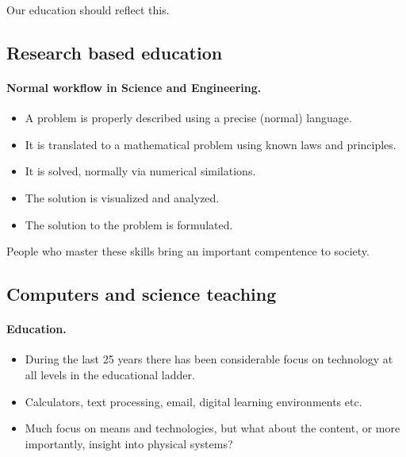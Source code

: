 \documentclass[%
twoside,                 %
final,                   %
10pt]{article}
\begin{document}
\noindent
Our education should reflect this.





\subsection{Research based education}

\paragraph{Normal workflow in Science and Engineering.}

\begin{itemize}
\item A problem is properly described using a precise (normal) language.

\item It is translated to a mathematical problem using known laws and  principles.

\item It is solved, normally via numerical similations.

\item The solution is visualized and analyzed.

\item The solution to the problem is formulated.
\end{itemize}

\noindent
People who master these skills bring an important compentence to society.



\subsection{Computers and science teaching}

\paragraph{Education.}

\begin{itemize}
\item During the  last 25 years  there has been considerable focus on  technology at all levels in the educational ladder.

\item Calculators, text processing, email, digital learning environments etc.

\item Much focus on means and technologies, but what about the content, or more importantly, insight into  physical systems?
\end{itemize}
\end{document}
